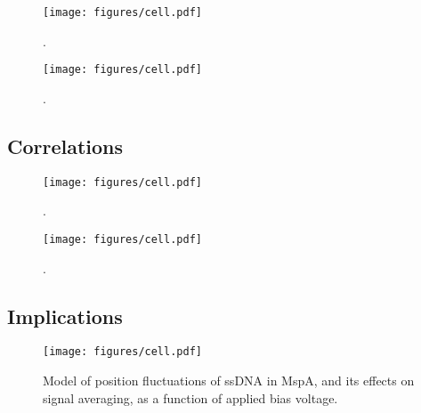 \begin{figure}[h]
\begin{centering}
\texttt{[image: figures/cell.pdf]}
\caption[Position fluctuations of ssDNA in MspA]{.}
\label{fig:position_fluctuations}
\end{centering}
\end{figure}

\begin{figure}[h]
\begin{centering}
\texttt{[image: figures/cell.pdf]}
\caption[Thermal motion averaging and sequencing data]{.}
\label{fig:thermal_motion}
\end{centering}
\end{figure}

\subsection{Correlations}

\begin{figure}[h]
\begin{centering}
\texttt{[image: figures/cell.pdf]}
\caption[Correlation between force and current]{.}
\label{fig:force_current_correlation}
\end{centering}
\end{figure}

\begin{figure}[h]
\begin{centering}
\texttt{[image: figures/cell.pdf]}
\caption[Correlation between diffusion and noise]{.}
\label{fig:diffusion_noise_correlation}
\end{centering}
\end{figure}

\subsection{Implications}

\begin{figure}[h]
\begin{centering}
\texttt{[image: figures/cell.pdf]}
\caption[Thermal motion averaging with voltage]{Model of position fluctuations of ssDNA in MspA, and its effects on signal averaging, as a function of applied bias voltage.}
\label{fig:thermal_motion_projections}
\end{centering}
\end{figure}
